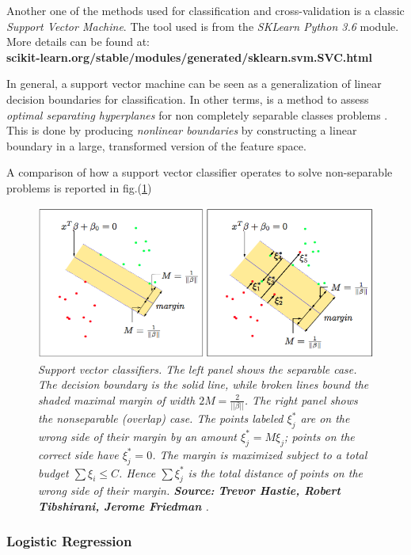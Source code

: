 \documentclass[12pt,openright,twoside,a4paper]{book}
\begin{document}
Another one of the methods used for classification and cross-validation is a classic \textit{Support Vector Machine}. The tool used is from the \textit{SKLearn Python 3.6} module.
More details can be found at:\\
 \textbf{scikit-learn.org/stable/modules/generated/sklearn.svm.SVC.html}
 
In general, a support vector machine can be seen as a generalization of linear decision boundaries for classification. 
In other terms, is a method to assess \textit{optimal separating hyperplanes} for non completely separable classes problems \cite{ESL}.
This is done by producing \textit{nonlinear boundaries} by constructing a linear boundary in a large, transformed version of the feature space.

A comparison of how a support vector classifier operates to solve non-separable problems is reported in fig.(\ref{svmc})
\clearpage

\begin{figure}[!h]
\centering
\includegraphics[scale=0.55]{svmc}
\caption{\textit{Support vector classifiers. The left panel shows the separable case. The decision boundary is the solid line, while broken lines bound the shaded maximal margin of width $2M=\frac{2}{||\beta ||}$.  The right panel shows the nonseparable (overlap) case. The points labeled $\xi^{\ast}_j$ are on the wrong side of their margin by an amount $\xi^{\ast}_j=M\xi_j$; points on the correct side have $\xi^{\ast}_j=0$. The margin is maximized subject to a total budget $\sum\xi_i\leq C$. Hence $\sum \xi^{\ast}_j$ is the total distance of points on the wrong side of their margin. \textbf{Source:} \textbf{Trevor Hastie, Robert Tibshirani, Jerome Friedman} \cite{ESL}. }}
\label{svmc}
\end{figure}

\subsubsection{Logistic Regression}
\end{document}
